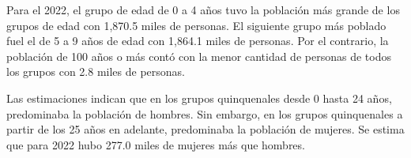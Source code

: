 Para el 2022, el grupo de edad de 0 a 4 años tuvo la población más grande de los grupos de edad con 1,870.5 miles de personas. El siguiente grupo más poblado fuel el de 5 a 9 años de edad con 1,864.1 miles de personas. Por el contrario,  la población de 100 años o más contó con la menor cantidad de personas de todos los grupos con 2.8 miles de personas. 

Las estimaciones indican que en los grupos quinquenales desde 0 hasta 24 años, predominaba la población de hombres. Sin embargo, en los grupos quinquenales a partir de los 25 años en adelante, predominaba la población de mujeres. Se estima que para 2022 hubo 277.0 miles de mujeres más que hombres.